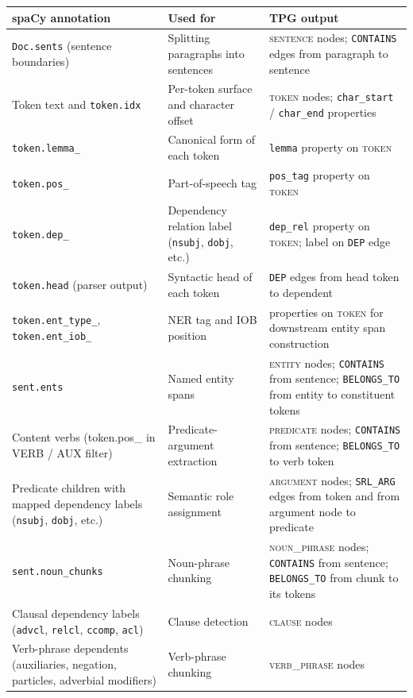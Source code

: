 \documentclass[11pt]{article}
\begin{document}
\begin{table}[h]
\centering
\small
\begin{tabular}{p{}p{}p{}}
\toprule
spaCy annotation & Used for & TPG output \\
\midrule
\texttt{Doc.sents} (sentence boundaries) & Splitting paragraphs into sentences & \textsc{sentence} nodes; \texttt{CONTAINS} edges from paragraph to sentence \\
Token text and \texttt{token.idx} & Per-token surface and character offset & \textsc{token} nodes; \texttt{char\_start} / \texttt{char\_end} properties \\
\texttt{token.lemma\_} & Canonical form of each token & \texttt{lemma} property on \textsc{token} \\
\texttt{token.pos\_} & Part-of-speech tag & \texttt{pos\_tag} property on \textsc{token} \\
\texttt{token.dep\_} & Dependency relation label (\texttt{nsubj}, \texttt{dobj}, etc.) & \texttt{dep\_rel} property on \textsc{token}; label on \texttt{DEP} edge \\
\texttt{token.head} (parser output) & Syntactic head of each token & \texttt{DEP} edges from head token to dependent \\
\texttt{token.ent\_type\_}, \texttt{token.ent\_iob\_} & NER tag and IOB position & properties on \textsc{token} for downstream entity span construction \\
\texttt{sent.ents} & Named entity spans & \textsc{entity} nodes; \texttt{CONTAINS} from sentence; \texttt{BELONGS\_TO} from entity to constituent tokens \\
Content verbs (token.pos\_ in VERB / AUX filter) & Predicate-argument extraction & \textsc{predicate} nodes; \texttt{CONTAINS} from sentence; \texttt{BELONGS\_TO} to verb token \\
Predicate children with mapped dependency labels (\texttt{nsubj}, \texttt{dobj}, etc.) & Semantic role assignment & \textsc{argument} nodes; \texttt{SRL\_ARG} edges from token and from argument node to predicate \\
\texttt{sent.noun\_chunks} & Noun-phrase chunking & \textsc{noun\_phrase} nodes; \texttt{CONTAINS} from sentence; \texttt{BELONGS\_TO} from chunk to its tokens \\
Clausal dependency labels (\texttt{advcl}, \texttt{relcl}, \texttt{ccomp}, \texttt{acl}) & Clause detection & \textsc{clause} nodes \\
Verb-phrase dependents (auxiliaries, negation, particles, adverbial modifiers) & Verb-phrase chunking & \textsc{verb\_phrase} nodes \\

\end{tabular}
\end{table}
\end{document}
